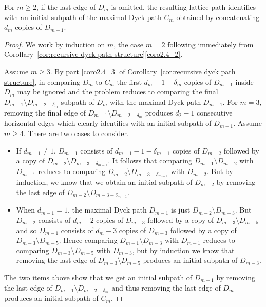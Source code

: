 \begin{corollary}
 \label{cor:initial subpath}
 For $m\ge2$, if the last edge of $D_m$ is omitted, the resulting lattice path identifies with an initial subpath of the maximal Dyck path $C_m$ obtained by concatenating $d_m$ copies of $D_{m-1}$.
\end{corollary}
\begin{proof}
 We work by induction on $m$, the case $m=2$ following immediately from Corollary~\ref{cor:recursive dyck path structure}\ref{coro2.4_2}. 

 Assume $m\ge3$.
 By part \ref{coro2.4_3} of Corollary~\ref{cor:recursive dyck path structure}, in comparing $D_m$ to $C_m$ the first $d_m-1-\delta_m$ copies of $D_{m-1}$ inside $D_m$ may be ignored and the problem reduces to comparing the final $D_{m-1}\setminus D_{m-2-\delta_m}$ subpath of $D_m$ with the maximal Dyck path $D_{m-1}$.
 For $m=3$, removing the final edge of $D_{m-1}\setminus D_{m-2-\delta_m}$ produces $d_2-1$ consecutive horizontal edges which clearly identifies with an initial subpath of $D_{m-1}$.
 Assume $m\ge4$.
 There are two cases to consider.
 \begin{itemize}
 \item If $d_{m-1}\ne1$, $D_{m-1}$ consists of $d_{m-1}-1-\delta_{m-1}$ copies of $D_{m-2}$ followed by a copy of $D_{m-2}\setminus D_{m-3-\delta_{m-1}}$. 
 It follows that comparing $D_{m-1}\setminus D_{m-2}$ with $D_{m-1}$ reduces to comparing $D_{m-2}\setminus D_{m-3-\delta_{m-1}}$ with $D_{m-2}$.
 But by induction, we know that we obtain an initial subpath of $D_{m-2}$ by removing the last edge of $D_{m-2}\setminus D_{m-3-\delta_{m-1}}$.
 \item When $d_{m-1}=1$, the maximal Dyck path $D_{m-1}$ is just $D_{m-2}\setminus D_{m-3}$. 
 But $D_{m-2}$ consists of $d_m-2$ copies of $D_{m-3}$ followed by a copy of $D_{m-3}\setminus D_{m-5}$ and so $D_{m-1}$ consists of $d_m-3$ copies of $D_{m-3}$ followed by a copy of $D_{m-3}\setminus D_{m-5}$. 
 Hence comparing $D_{m-1}\setminus D_{m-3}$ with $D_{m-1}$ reduces to comparing $D_{m-3}\setminus D_{m-5}$ with $D_{m-3}$, but by induction we know that removing the last edge of $D_{m-3}\setminus D_{m-5}$ produces an initial subpath of $D_{m-3}$.
 \end{itemize}
 The two items above show that we get an initial subpath of $D_{m-1}$ by removing the last edge of $D_{m-1}\setminus D_{m-2-\delta_m}$ and thus removing the last edge of $D_m$ produces an initial subpath of $C_m$. 
\end{proof}

